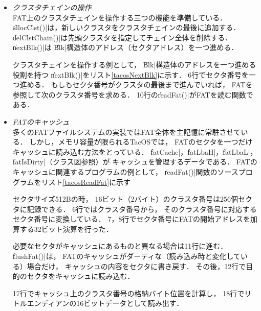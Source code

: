 \begin{itemize}
  普通のクラスタを読む場合は
  クラスタ番号からセクタ番号へ変換する計算を行う（12〜16行）．
  クラスタ番号から2を引いている（12行）のは，
  普通のクラスタ番号は2から始まるからである．

  セクタ番号が決まったら，
  mmcspiクラス（デバイスドライバクラス）の\|readSct()|を用いて
  セクタを\|buf|に読み込む．

  

\item \emph{クラスタチェインの操作}\\
  FAT上のクラスタチェインを操作する三つの機能を準備している．
  \|allocClst()|は，新しいクラスタをクラスタチェインの最後に追加する．
  \|delClstChain()|は先頭クラスタを指定してチェイン全体を削除する．
  \|nextBlk()|は \|Blk|構造体のアドレス（セクタアドレス）を一つ進める．

  クラスタチェインを操作する例として，
  \|Blk|構造体のアドレスを一つ進める役割を持つ
  \|nextBlk()|をリスト\ref{tacosNextBlk}に示す．
  6行でセクタ番号を一つ進める．
  もしもセクタ番号がクラスタの最後まで進んでいれば，
  FATを参照して次のクラスタ番号を求める．
  10行の\|readFat()|がFATを読む関数である．

  

\item \emph{FATのキャッシュ}\\
  多くのFATファイルシステムの実装ではFAT全体を主記憶に常駐させている．
  しかし，メモリ容量が限られるTacOSでは，
  FATのセクタを一つだけキャッシュに読み込む方法をとっている．
  \|fatCache|，\|fatLbaH|，\|fatLbaL|，\|fatIsDirty|（クラス図参照）が
  キャッシュを管理するデータである．
  FATのキャッシュに関連するプログラムの例として，
  \|readFat()|関数のソースプログラムをリスト\ref{tacosReadFat}に示す  

  

  セクタサイズ512Bの時，
  16ビット（2バイト）のクラスタ番号は256個セクタに記録できる．
  6行ではクラスタ番号から，
  そのクラスタ番号に対応するセクタ番号に変換している．
  7，8行でセクタ番号にFATの開始アドレスを加算する32ビット演算を行った．
  
  必要なセクタがキャッシュにあるものと異なる場合は11行に進む．
  \|flushFat()|は，
  FATのキャッシュがダーティな（読み込み時と変化している）場合だけ，
  キャッシュの内容をセクタに書き戻す．
  その後，12行で目的のセクタをキャッシュに読み込む．

  17行でキャッシュ上のクラスタ番号の格納バイト位置を計算し，
  18行でリトルエンディアンの16ビットデータとして読み出す．
\end{itemize}

